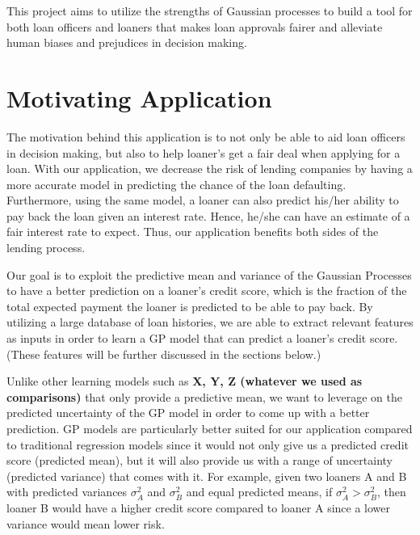 \documentclass[a4paper]{article}
\theoremstyle{genius}
\begin{document}
This project aims to utilize the strengths of Gaussian processes to build a tool for both loan officers and loaners that makes loan approvals fairer and alleviate human biases and prejudices in decision making.

\section{Motivating Application}
The motivation behind this application is to not only be able to aid loan officers in decision making, but also to help loaner's get a fair deal when applying for a loan. With our application, we decrease the risk of lending companies by having a more accurate model in predicting the chance of the loan defaulting. Furthermore, using the same model, a loaner can also predict his/her ability to pay back the loan given an interest rate. Hence, he/she can have an estimate of a fair interest rate to expect. Thus, our application benefits both sides of the lending process.

Our goal is to exploit the predictive mean and variance of the Gaussian Processes to have a better prediction on a loaner's credit score, which is the fraction of the total expected payment the loaner is predicted to be able to pay back. By utilizing a large database of loan histories, we are able to extract relevant features as inputs in order to learn a GP model that can predict a loaner's credit score. (These features will be further discussed in the sections below.) 

Unlike other learning models such as \textbf{X, Y, Z (whatever we used as comparisons)} that only provide a predictive mean, we want to leverage on the predicted uncertainty of the GP model in order to come up with a better prediction. GP models are particularly better suited for our application compared to traditional regression models since it would not only give us a predicted credit score (predicted mean), but it will also provide us with a range of uncertainty (predicted variance) that comes with it. For example, given two loaners A and B with predicted variances $\sigma_{A}^2$ and $\sigma_{B}^2$ and equal predicted means, if $\sigma_{A}^2>\sigma_{B}^2$, then loaner B would have a higher credit score compared to loaner A since a lower variance would mean lower risk.
\end{document}
